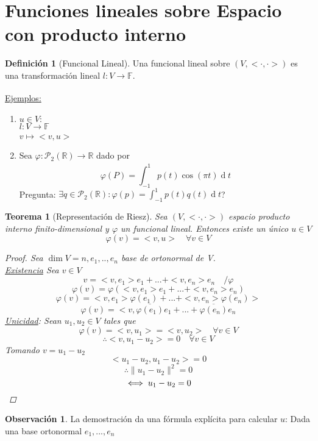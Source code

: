\documentclass[11pt]{book}
\renewcommand{\d}[1]{\ensuremath{\operatorname{d}\!{#1}}}
\newcommand{\set}[1]{\mathbb{#1}}
\newcommand{\func}[5]{#1:#2\xrightarrow[#5]{#4}#3}
\newtheorem{thm}{Teorema}[section]
\theoremstyle{definition}
\newtheorem{defn}{Definición}[section]
\newtheorem{obs}{Observación}[section]
\begin{document}
\section{Funciones lineales sobre Espacio con producto interno}
\begin{defn}[Funcional Lineal]
	Una funcional lineal sobre $(V,<\cdot,\cdot>)$ es una transformación lineal $\func{l}{V}{\set{F}}{}{}$.
\end{defn}
\underline{Ejemplos:}
\begin{enumerate}
	\item $u\in V:$\\
	$\func{l}{V}{\set{F}}{}{}$\\
	$v\mapsto <v,u>$

	\item Sea $\func{\varphi}{\mathcal{P}_2(\set{R})}{\set{R}}{}{}$ dado por
	\[\varphi(P)=\int^1_{-1}p(t)\cos(\pi t)\d{t}\]
	Pregunta: $\exists q\in\mathcal{P}_2(\set{R}):\varphi(p)=\int^1_{-1}p(t)q(t)\d{t}$?
\end{enumerate}
\begin{thm}[Representación de Riesz]
	Sea $(V,<\cdot,\cdot>)$ espacio producto interno finito-dimensional y $\varphi$ un funcional lineal. Entonces existe un único $u\in V$
	\[\varphi(v)=<v,u>\quad\forall v\in V\]
	\begin{proof}
		Sea $\dim V=n, e_1,..,e_n$ base de ortonormal de V.\\
		\underline{Existencia} Sea $v\in V$
		\[v=<v,e_1>e_1+...+<v,e_n>e_n\quad/\varphi\]
		\[\varphi(v)=\varphi(<v,e_1>e_1+...+<v,e_n>e_n)\]
		\[\varphi(v)=<v,e_1>\varphi(e_1)+...+<v,e_n>\varphi(e_n)>\]
		\[\varphi(v)=<v,\overline{\varphi(e_1)}e_1+...+\overline{\varphi(e_n)}e_n\]
		\underline{Unicidad}: Sean $u_1,u_2\in V$ tales que
		\[\varphi(v)=<v,u_1>=<v,u_2>\quad\forall v\in V\]
		\[\therefore <v,u_1-u_2>=0\quad\forall v\in V\]
		Tomando $v=u_1-u_2$
		\[<u_1-u_2,u_1-u_2>=0\]
		\[\therefore\|u_1-u_2\|^2=0\]
		\[\iff u_1-u_2=0\qedhere\]
	\end{proof}
\end{thm}
\begin{obs}
	La demostración da una fórmula explícita para calcular $u$: Dada una base ortonormal $e_1,...,e_n$
\end{obs}
\end{document}
